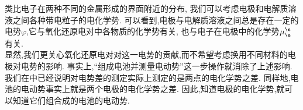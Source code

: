 \documentclass{ctexart}
\begin{document}
\indent 类比电子在两种不同的金属形成的界面附近的分布,%
我们可以考虑电极和电解质溶液之间各种带电粒子的电化学势.
可以看到,电极与电解质溶液之间总是存在一定的电势$\varphi$,它与氧化还原电对中各物质的化学势有关,%
也与电子在电极中的化学势$\mu_\e^\s$有关.\\
\indent 显然,我们更关心氧化还原电对对这一电势的贡献,而不希望考虑换用不同材料的电极对电势的影响.%
事实上,“组成电池并测量电动势”这一步操作就消除了上述影响.\\
\indent 我们在中已经说明对电势差的测定实际上测定的是两点的电化学势之差.%
同样地,电池的电动势事实上就是两个电极的电化学势之差.%
因此,知道电极的电化学势,就可以知道它们组合成的电池的电动势.
\begin{definition}[6C.1.4 电极电势]
    
\end{definition}
\end{document}
